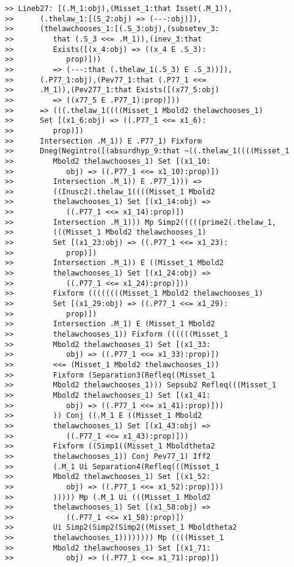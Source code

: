 \documentclass[12pt]{article}
\begin{document}
\begin{verbatim}
>> Lineb27: [(.M_1:obj),(Misset_1:that Isset(.M_1)),
>>      (.thelaw_1:[(S_2:obj) => (---:obj)]),
>>      (thelawchooses_1:[(.S_3:obj),(subsetev_3:
>>         that (.S_3 <<= .M_1)),(inev_3:that
>>         Exists([(x_4:obj) => ((x_4 E .S_3):
>>            prop)]))
>>         => (---:that (.thelaw_1(.S_3) E .S_3))]),
>>      (.P77_1:obj),(Pev77_1:that (.P77_1 <<=
>>      .M_1)),(Pev277_1:that Exists([(x77_5:obj)
>>         => ((x77_5 E .P77_1):prop)]))
>>      => (((.thelaw_1((((Misset_1 Mbold2 thelawchooses_1)
>>      Set [(x1_6:obj) => ((.P77_1 <<= x1_6):
>>         prop)])
>>      Intersection .M_1)) E .P77_1) Fixform
>>      Dneg(Negintro([(absurdhyp_9:that ~((.thelaw_1((((Misset_1
>>         Mbold2 thelawchooses_1) Set [(x1_10:
>>            obj) => ((.P77_1 <<= x1_10):prop)])
>>         Intersection .M_1)) E .P77_1))) =>
>>         ((Inusc2(.thelaw_1((((Misset_1 Mbold2
>>         thelawchooses_1) Set [(x1_14:obj) =>
>>            ((.P77_1 <<= x1_14):prop)])
>>         Intersection .M_1))) Mp Simp2(((((prime2(.thelaw_1,
>>         (((Misset_1 Mbold2 thelawchooses_1)
>>         Set [(x1_23:obj) => ((.P77_1 <<= x1_23):
>>            prop)])
>>         Intersection .M_1)) E ((Misset_1 Mbold2
>>         thelawchooses_1) Set [(x1_24:obj) =>
>>            ((.P77_1 <<= x1_24):prop)]))
>>         Fixform ((((((((Misset_1 Mbold2 thelawchooses_1)
>>         Set [(x1_29:obj) => ((.P77_1 <<= x1_29):
>>            prop)])
>>         Intersection .M_1) E (Misset_1 Mbold2
>>         thelawchooses_1)) Fixform ((((((Misset_1
>>         Mbold2 thelawchooses_1) Set [(x1_33:
>>            obj) => ((.P77_1 <<= x1_33):prop)])
>>         <<= (Misset_1 Mbold2 thelawchooses_1))
>>         Fixform (Separation3(Refleq((Misset_1
>>         Mbold2 thelawchooses_1))) Sepsub2 Refleq(((Misset_1
>>         Mbold2 thelawchooses_1) Set [(x1_41:
>>            obj) => ((.P77_1 <<= x1_41):prop)]))
>>         )) Conj ((.M_1 E ((Misset_1 Mbold2
>>         thelawchooses_1) Set [(x1_43:obj) =>
>>            ((.P77_1 <<= x1_43):prop)]))
>>         Fixform ((Simp1((Misset_1 Mboldtheta2
>>         thelawchooses_1)) Conj Pev77_1) Iff2
>>         (.M_1 Ui Separation4(Refleq(((Misset_1
>>         Mbold2 thelawchooses_1) Set [(x1_52:
>>            obj) => ((.P77_1 <<= x1_52):prop)]))
>>         ))))) Mp (.M_1 Ui (((Misset_1 Mbold2
>>         thelawchooses_1) Set [(x1_58:obj) =>
>>            ((.P77_1 <<= x1_58):prop)])
>>         Ui Simp2(Simp2(Simp2((Misset_1 Mboldtheta2
>>         thelawchooses_1)))))))) Mp ((((Misset_1
>>         Mbold2 thelawchooses_1) Set [(x1_71:
>>            obj) => ((.P77_1 <<= x1_71):prop)])

\end{verbatim}
\end{document}
